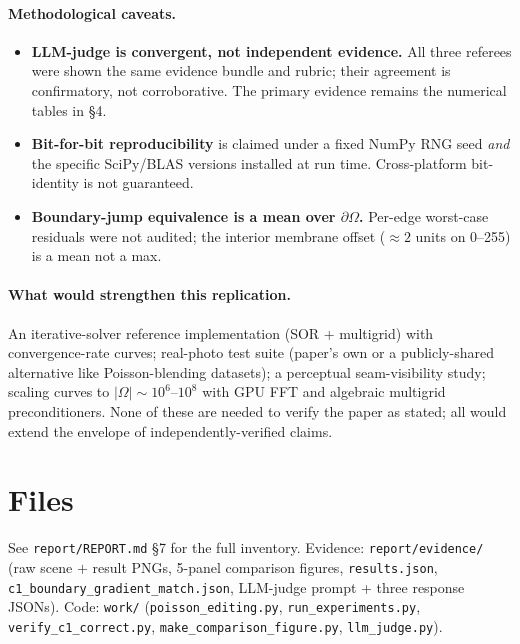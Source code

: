 \documentclass[11pt]{article}
\begin{document}
\paragraph{Methodological caveats.}
\begin{itemize}
  \item \textbf{LLM-judge is convergent, not independent evidence.} All
        three referees were shown the same evidence bundle and rubric; their
        agreement is confirmatory, not corroborative. The primary evidence
        remains the numerical tables in \S 4.
  \item \textbf{Bit-for-bit reproducibility} is claimed under a fixed NumPy
        RNG seed \emph{and} the specific SciPy/BLAS versions installed at
        run time. Cross-platform bit-identity is not guaranteed.
  \item \textbf{Boundary-jump equivalence is a mean over $\partial\Omega$.}
        Per-edge worst-case residuals were not audited; the interior
        membrane offset ($\approx 2$ units on 0--255) is a mean not a max.
\end{itemize}

\paragraph{What would strengthen this replication.}
An iterative-solver reference implementation (SOR + multigrid) with
convergence-rate curves; real-photo test suite (paper's own or a
publicly-shared alternative like Poisson-blending datasets); a perceptual
seam-visibility study; scaling curves to $|\Omega|\sim 10^6$--$10^8$ with
GPU FFT and algebraic multigrid preconditioners. None of these are needed
to verify the paper as stated; all would extend the envelope of
independently-verified claims.

\section{Files}
See \texttt{report/REPORT.md} \S 7 for the full inventory.
Evidence: \texttt{report/evidence/} (raw scene $+$ result PNGs, 5-panel
comparison figures, \texttt{results.json},
\texttt{c1\_boundary\_gradient\_match.json}, LLM-judge prompt + three
response JSONs).
Code: \texttt{work/} (\texttt{poisson\_editing.py},
\texttt{run\_experiments.py}, \texttt{verify\_c1\_correct.py},
\texttt{make\_comparison\_figure.py}, \texttt{llm\_judge.py}).
\end{document}
